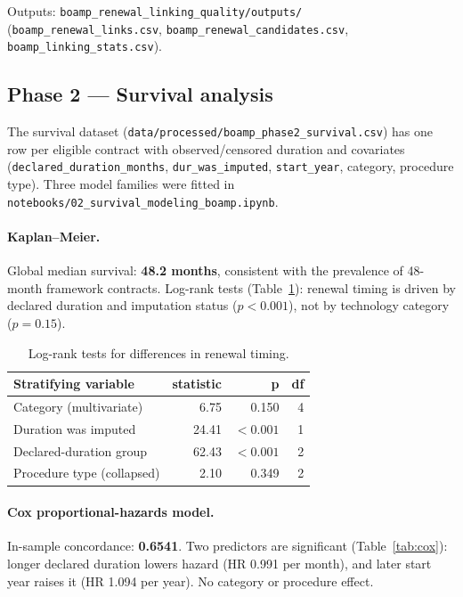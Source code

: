 \documentclass[11pt,a4paper]{article}
\begin{document}
Outputs: \nolinkurl{boamp_renewal_linking_quality/outputs/} (\nolinkurl{boamp_renewal_links.csv},
\nolinkurl{boamp_renewal_candidates.csv}, \nolinkurl{boamp_linking_stats.csv}).

\subsection{Phase 2 --- Survival analysis}
\label{sec:survival}

The survival dataset (\nolinkurl{data/processed/boamp_phase2_survival.csv}) has
one row per eligible contract with observed/censored duration and covariates
(\nolinkurl{declared_duration_months}, \nolinkurl{dur_was_imputed}, \texttt{start\_year},
category, procedure type). Three model families were fitted in
\nolinkurl{notebooks/02_survival_modeling_boamp.ipynb}.

\paragraph{Kaplan--Meier.} Global median survival: \textbf{48.2 months},
consistent with the prevalence of 48-month framework contracts.
Log-rank tests (Table~\ref{tab:logrank}): renewal timing is driven by
declared duration and imputation status ($p<0.001$), not by technology category
($p=0.15$).

\begin{table}[H]
\centering
\caption{Log-rank tests for differences in renewal timing.}
\label{tab:logrank}
\small
\begin{tabular}{@{}lrrr@{}}
\toprule
\textbf{Stratifying variable} & \textbf{statistic} & \textbf{p} & \textbf{df} \\
\midrule
Category (multivariate)        &  6.75 & 0.150 & 4 \\
Duration was imputed           & 24.41 & $<0.001$ & 1 \\
Declared-duration group        & 62.43 & $<0.001$ & 2 \\
Procedure type (collapsed)     &  2.10 & 0.349 & 2 \\
\bottomrule
\end{tabular}
\end{table}

\paragraph{Cox proportional-hazards model.} In-sample concordance:
\textbf{0.6541}. Two predictors are significant (Table~\ref{tab:cox}): longer
declared duration lowers hazard (HR 0.991 per month), and later start year
raises it (HR 1.094 per year). No category or procedure effect.
\end{document}
